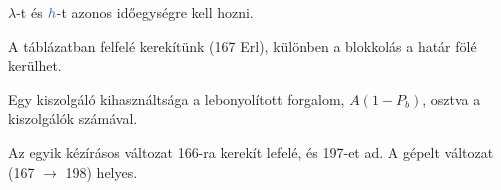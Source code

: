 $\lambda$-t és ${\ca{h}}$-t azonos időegységre kell hozni.

\begin{center}\end{center}

A táblázatban felfelé kerekítünk (167 Erl), különben a blokkolás a határ fölé kerülhet.

\begin{center}\end{center}

\begin{center}\end{center}

Egy kiszolgáló kihasználtsága a lebonyolított forgalom, $A(1-P_b)$, osztva a kiszolgálók számával.

\begin{center}\end{center}
\begin{figyelem}[Javítás]
Az egyik kézírásos változat 166-ra kerekít lefelé, és 197-et ad. A gépelt változat (167 $\to$ 198) helyes.
\end{figyelem}
\begin{eredmeny}

\begin{center}\end{center}
\end{eredmeny}


